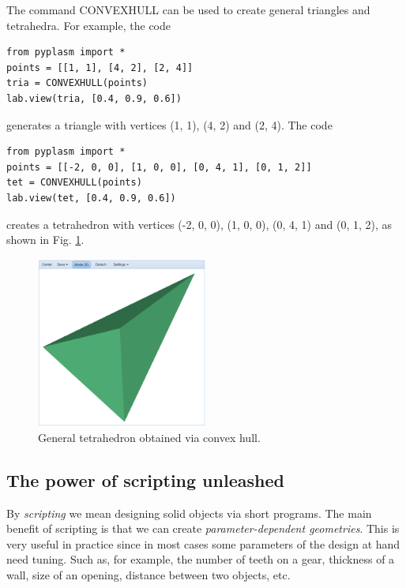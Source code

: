 \documentclass{article}
\begin{document}
The command CONVEXHULL can be used to create general triangles and 
tetrahedra. For example, the code

\begin{verbatim}
from pyplasm import *
points = [[1, 1], [4, 2], [2, 4]]
tria = CONVEXHULL(points)
lab.view(tria, [0.4, 0.9, 0.6])
\end{verbatim}
generates a triangle with vertices (1, 1), (4, 2) and (2, 4). The code

\begin{verbatim}
from pyplasm import *
points = [[-2, 0, 0], [1, 0, 0], [0, 4, 1], [0, 1, 2]]
tet = CONVEXHULL(points)
lab.view(tet, [0.4, 0.9, 0.6])
\end{verbatim}
creates a tetrahedron with vertices (-2, 0, 0), (1, 0, 0), (0, 4, 1) and (0, 1, 2),
as shown in Fig. \ref{fig:chull}.
\newpage

\begin{figure}[!ht]
\begin{center}
\includegraphics[width=0.5\textwidth]{img/chull.png}
\end{center}
\vspace{-2mm}
\caption{General tetrahedron obtained via convex hull.}
\label{fig:chull}
\end{figure}
\noindent

\subsection{The power of scripting unleashed}

By {\em scripting} we mean designing solid objects via 
short programs. The main benefit of scripting is that we can 
create {\em parameter-dependent geometries}. This is 
very useful in practice since in most cases some parameters of 
the design at hand need tuning. Such as, for example, the 
number of teeth on a gear, thickness of a wall, size of an
opening, distance between two objects, etc.
\end{document}
